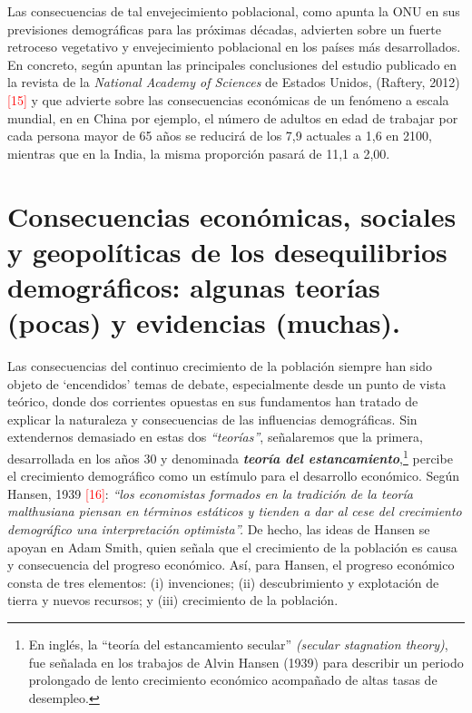 Las consecuencias de tal envejecimiento poblacional, como apunta la ONU en sus previsiones demogr\'aficas para las pr\'oximas d\'ecadas, advierten sobre un fuerte retroceso vegetativo y envejecimiento poblacional en los pa\'ises m\'as desarrollados. En concreto, seg\'un apuntan las principales conclusiones del estudio publicado en la revista de la \textit{National Academy of Sciences} de Estados Unidos, (Raftery, 2012) \textcolor{red}{[15]} y que advierte sobre las consecuencias económicas de un fen\'omeno a escala mundial, en en China por ejemplo, el n\'umero de adultos en edad de trabajar por cada persona mayor de 65 a\~nos se reducir\'a de los 7,9 actuales a 1,6 en 2100, mientras que en la India, la misma proporci\'on pasar\'a de 11,1 a 2,00.



\section{Consecuencias econ\'omicas, sociales y geopol\'iticas de los desequilibrios demogr\'aficos: algunas teor\'ias (pocas) y evidencias (muchas).}

Las consecuencias del continuo crecimiento de la poblaci\'on siempre han sido objeto de `encendidos' temas de debate, especialmente desde un punto de vista te\'orico, donde dos corrientes opuestas en sus fundamentos han tratado de explicar la naturaleza y consecuencias de las influencias demogr\'aficas. Sin extendernos demasiado en estas dos \textit{``teor\'ias''}, se\~nalaremos que la primera, desarrollada en los a\~nos 30 y  denominada \textbf{\textit{teor\'ia del estancamiento}},\footnote{En ingl\'es, la  ``teor\'ia del estancamiento secular'' \textit{(secular stagnation theory)}, fue se\~nalada en los trabajos de Alvin Hansen (1939) para describir un periodo prolongado de lento crecimiento econ\'omico acompa\~nado de altas tasas de desempleo.} percibe el crecimiento demogr\'afico como un est\'imulo para el desarrollo econ\'omico. Seg\'un Hansen, 1939 \textcolor{red}{[16]}: \textit{``los economistas formados en la tradici\'on de la teor\'ia malthusiana piensan en t\'erminos est\'aticos y tienden a dar al cese del crecimiento demogr\'afico una interpretaci\'on optimista''.} De hecho, las ideas de Hansen se apoyan en Adam Smith, quien se\~nala que el crecimiento de la poblaci\'on es causa y consecuencia del progreso econ\'omico. As\'i, para Hansen, el progreso econ\'omico consta de tres elementos: (i) invenciones; (ii) descubrimiento y explotaci\'on de tierra y nuevos recursos; y (iii) crecimiento de la poblaci\'on.\\

